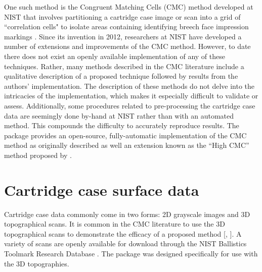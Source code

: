 One such method is the Congruent Matching Cells (CMC) method developed
at NIST that involves partitioning a cartridge case image or scan into a
grid of ``correlation cells" to isolate areas containing identifying
breech face impression markings \citep{song_proposed_2013}. Since its
invention in 2012, researchers at NIST have developed a number of
extensions and improvements of the CMC method. However, to date there
does not exist an openly available implementation of any of these
techniques. Rather, many methods described in the CMC literature include
a qualitative description of a proposed technique followed by results
from the authors' implementation. The description of these methods do
not delve into the intricacies of the implementation, which makes it
especially difficult to validate or assess. Additionally, some
procedures related to pre-processing the cartridge case data are
seemingly done by-hand at NIST rather than with an automated method.
This compounds the difficulty to accurately reproduce results. The
 package provides an open-source, fully-automatic
implementation of the CMC method as originally described as well an
extension known as the ``High CMC'' method proposed by
\citet{tong_improved_2015}.

\hypertarget{data}{%
\section{Cartridge case surface data}\label{data}}

Cartridge case data commonly come in two forms: 2D grayscale images and
3D topographical scans. It is common in the CMC literature to use the 3D
topographical scans to demonstrate the efficacy of a proposed method
{[}\citep{tong_improved_2015}, \citep{chen_convergence_2017}{]}. A
variety of scans are openly available for download through the NIST
Ballistics Toolmark Research Database \citep{nbtrd}. The 
package was designed specifically for use with the 3D topographies.

